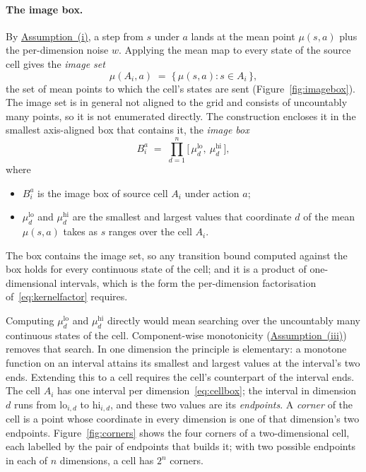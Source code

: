 \documentclass[11pt,a4paper]{article}
\theoremstyle{plain}
\theoremstyle{remark}
\begin{document}
	\paragraph{The image box.}
	By \hyperref[ass:sysclass]{Assumption~(i)}, a step from $s$ under $a$ lands at the mean point $\mu(s, a)$ plus the per-dimension noise $w$. Applying the mean map to every state of the source cell gives the \emph{image set}
	\begin{equation}
		\mu(A_i, a) \;=\; \{\, \mu(s, a) : s \in A_i \,\},
		\label{eq:imageset}
	\end{equation}
	the set of mean points to which the cell's states are sent (Figure~\ref{fig:imagebox}). The image set is in general not aligned to the grid and consists of uncountably many points, so it is not enumerated directly. The construction encloses it in the smallest axis-aligned box that contains it, the \emph{image box}
	\begin{equation}
		B_i^a \;=\; \prod_{d=1}^{n} \bigl[\, \mu_d^{\text{lo}},\ \mu_d^{\text{hi}} \,\bigr],
		\label{eq:imageboxdef}
	\end{equation}
	where
	\begin{itemize}
		\item $B_i^a$ is the image box of source cell $A_i$ under action $a$;
		\item $\mu_d^{\text{lo}}$ and $\mu_d^{\text{hi}}$ are the smallest and largest values that coordinate $d$ of the mean $\mu(s, a)$ takes as $s$ ranges over the cell $A_i$.
	\end{itemize}
	The box contains the image set, so any transition bound computed against the box holds for every continuous state of the cell; and it is a product of one-dimensional intervals, which is the form the per-dimension factorisation of~\eqref{eq:kernelfactor} requires.
	
	Computing $\mu_d^{\text{lo}}$ and $\mu_d^{\text{hi}}$ directly would
	mean searching over the uncountably many continuous states of the
	cell. Component-wise monotonicity
	(\hyperref[ass:sysclass]{Assumption~(iii)}) removes that search. In
	one dimension the principle is elementary: a monotone function on an
	interval attains its smallest and largest values at the interval's
	two ends. Extending this to a cell requires the cell's counterpart of
	the interval ends. The cell $A_i$ has one interval per
	dimension~\eqref{eq:cellbox}; the interval in dimension $d$ runs from
	$\mathrm{lo}_{i,d}$ to $\mathrm{hi}_{i,d}$, and these two values are
	its \emph{endpoints}. A \emph{corner} of the cell is a point whose
	coordinate in every dimension is one of that dimension's two
	endpoints. Figure~\ref{fig:corners} shows the four corners of a
	two-dimensional cell, each labelled by the pair of endpoints that
	builds it; with two possible endpoints in each of $n$ dimensions, a
	cell has $2^n$ corners.
	
\end{document}
